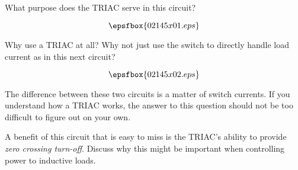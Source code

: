 

What purpose does the TRIAC serve in this circuit?

$$\epsfbox{02145x01.eps}$$

Why use a TRIAC at all?  Why not just use the switch to directly handle load current as in this next circuit?

$$\epsfbox{02145x02.eps}$$







The difference between these two circuits is a matter of switch currents.  If you understand how a TRIAC works, the answer to this question should not be too difficult to figure out on your own.







A benefit of this circuit that is easy to miss is the TRIAC's ability to provide {\it zero crossing turn-off}.  Discuss why this might be important when controlling power to inductive loads.




